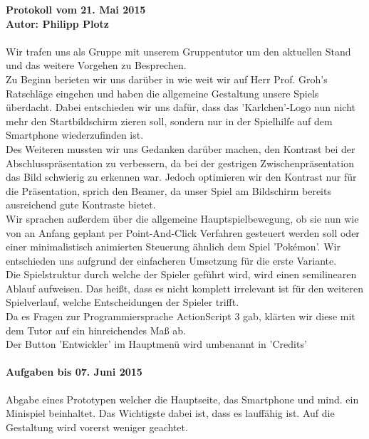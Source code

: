 \documentclass[a4paper,10pt]{article}
\begin{document}
{\bfseries \large Protokoll vom 21. Mai 2015 \\[1mm]		%
\normalfont Autor: Philipp Plotz}					%

\paragraph{}
Wir trafen uns als Gruppe mit unserem Gruppentutor um den aktuellen Stand und das weitere Vorgehen zu Besprechen.\\
Zu Beginn berieten wir uns darüber in wie weit wir auf Herr Prof. Groh's Ratschläge eingehen und haben die allgemeine Gestaltung unsere Spiels überdacht. Dabei entschieden wir uns dafür, dass das 'Karlchen'-Logo nun nicht mehr den Startbildschirm zieren soll, sondern nur in der Spielhilfe auf dem Smartphone wiederzufinden ist.\\Des Weiteren mussten wir uns Gedanken darüber machen, den Kontrast bei der Abschlusspräsentation zu verbessern, da bei der gestrigen Zwischenpräsentation das Bild schwierig zu erkennen war. Jedoch optimieren wir den Kontrast nur für die Präsentation, sprich den Beamer, da unser Spiel am Bildschirm bereits ausreichend gute Kontraste bietet.\\Wir sprachen außerdem über die allgemeine Hauptspielbewegung, ob sie nun wie von an Anfang geplant per Point-And-Click Verfahren gesteuert werden soll oder einer minimalistisch animierten Steuerung ähnlich dem Spiel 'Pokémon'. Wir entschieden uns aufgrund der einfacheren Umsetzung für die erste Variante.\\Die Spielstruktur durch welche der Spieler geführt wird, wird einen semilinearen Ablauf aufweisen. Das heißt, dass es nicht komplett irrelevant ist für den weiteren Spielverlauf, welche Entscheidungen der Spieler trifft.\\Da es Fragen zur Programmiersprache ActionScript 3 gab, klärten wir diese mit dem Tutor auf ein hinreichendes Maß ab.\\Der Button 'Entwickler' im Hauptmenü wird umbenannt in 'Credits'

\paragraph{Aufgaben bis 07. Juni 2015\\}
Abgabe eines Prototypen welcher die Hauptseite, das Smartphone und mind. ein Minispiel beinhaltet. Das Wichtigste dabei ist, dass es lauffähig ist. Auf die Gestaltung wird vorerst weniger geachtet.
\end{document}
